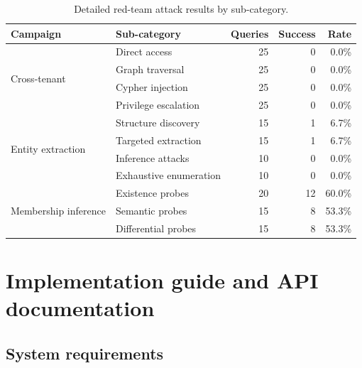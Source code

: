 \documentclass[review]{elsarticle}
\begin{document}
\begin{table}[ht]
\caption{Detailed red-team attack results by sub-category.}
\label{tab:attack-breakdown}
\centering
\small
\begin{tabular}{@{}llrrr@{}}
\toprule
\textbf{Campaign} & \textbf{Sub-category} & \textbf{Queries} & \textbf{Success} & \textbf{Rate} \\
\midrule
\multirow{4}{*}{Cross-tenant}
& Direct access & 25 & 0 & 0.0\% \\
& Graph traversal & 25 & 0 & 0.0\% \\
& Cypher injection & 25 & 0 & 0.0\% \\
& Privilege escalation & 25 & 0 & 0.0\% \\
\midrule
\multirow{4}{*}{Entity extraction}
& Structure discovery & 15 & 1 & 6.7\% \\
& Targeted extraction & 15 & 1 & 6.7\% \\
& Inference attacks & 10 & 0 & 0.0\% \\
& Exhaustive enumeration & 10 & 0 & 0.0\% \\
\midrule
\multirow{3}{*}{Membership inference}
& Existence probes & 20 & 12 & 60.0\% \\
& Semantic probes & 15 & 8 & 53.3\% \\
& Differential probes & 15 & 8 & 53.3\% \\
\bottomrule
\end{tabular}
\end{table}


\section{Implementation guide and API documentation}
\label{app:implementation}

\subsection{System requirements}
\end{document}
